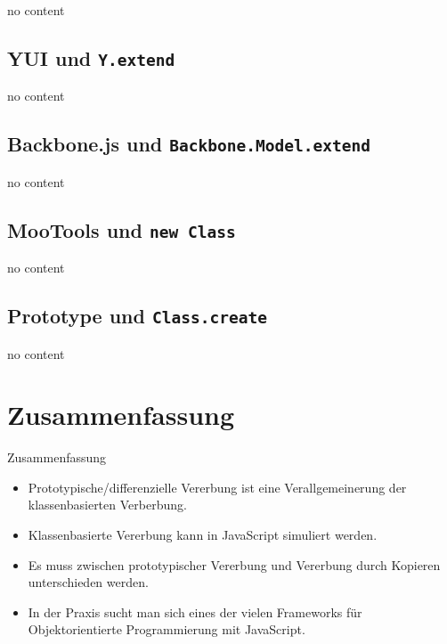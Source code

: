 \begin{frame}
  no content
\end{frame}

\subsection{YUI und \texttt{Y.extend}}

\begin{frame}
  no content
\end{frame}

\subsection{Backbone.js und \texttt{Backbone.Model.extend}}

\begin{frame}
  no content
\end{frame}

\subsection{MooTools und \texttt{new Class}}

\begin{frame}
  no content
\end{frame}

\subsection{Prototype und \texttt{Class.create}}

\begin{frame}
  no content
\end{frame}

\section*{Zusammenfassung}

\begin{frame}{Zusammenfassung}
  \begin{itemize}
    \item \alert{Prototypische/differenzielle Vererbung} ist eine \alert{Verallgemeinerung} der
      klassenbasierten Verberbung.
    \item \alert{Klassenbasierte Vererbung} kann in JavaScript \alert{simuliert} werden.
    \item Es muss zwischen \alert{prototypischer Vererbung} und \alert{Vererbung durch
      Kopieren} unterschieden werden.
    \item In der Praxis sucht man sich eines der \alert{vielen Frameworks} für
      \alert{Objektorientierte Programmierung mit JavaScript}.
  \end{itemize} 
\end{frame}

